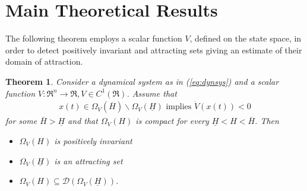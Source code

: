 \documentclass[letterpaper,10pt,twocolumn,journal,final]{IEEEtran}
\newtheorem{thm}{Theorem}[section]
\begin{document}
\section{Main Theoretical Results}\label{sec:theory}
The following theorem employs a scalar function $V$, defined on the state space, in order to detect positively invariant and attracting sets giving an estimate of their domain of attraction.
\begin{thm}\label{lem:contracting shell}
	Consider a dynamical system as in (\ref{eq:dynsys}) and a scalar function
	$V:\Re^n\rightarrow \Re, V\in C^{1}(\Re)$.
	Assume that
	\begin{align}
		x(t)\in\Omega_V(\overline H)\backslash \Omega_V(\underline H)
		\text{ implies } \dot V(x(t))<0
	\end{align}
	for some $\overline H > \underline H$ and that	$\Omega_V(H)$ is compact
	for every $\underline H < H < \overline H$.
	Then
	\begin{itemize}
		\item $\Omega_V(H)$ is positively invariant
		\item $\Omega_V(\underline H)$ is an attracting set
		\item $\Omega_V(H)\subseteq \mathcal{D}(\Omega_V(\underline H))$.
	\end{itemize}
\end{thm}
\end{document}

